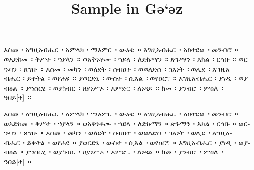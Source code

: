 \documentclass[12pt]{article}
\begin{document}
\title{Sample in Gǝ`ǝz}
\maketitle

\newdimen\savehsize
\savehsize\hsize

\def\test#1{\endgraf\hsize=1pt\noindent #1\endgraf\hsize=\savehsize}

\begin{amharic}
እስመ~፡ አግዚአብሔር~፡ አምላክ~፡ ማእምር~፡ ውእቱ~። እግዚአብሔር~፡ አስተደወ~፡ መንብሮ~። ወአድከመ~፡ ቅሥተ~፡ ኀያላን~። ወአቅነቶሙ~፡ ኀይለ~፡ ለድኩማን~። ጽጉማን~፡ እክል~፡ ርኅቡ~። ወርኁባን~፡ ጸግቡ~። እስመ~፡ መካን~፡ ወለደት~፡ ሰብዐተ~፡ ወወለድሰ~፡ ስእነት~፡ ወሊደ~፡ እግዚአብሔር~፡ ይቀትል~፡ ወየሐዩ~። ያወርድኒ~፡ ውስተ~፡ ሲእል~፡ ወየዐርግ~። እግዚአብሔር~፡ ያነዲ~፡ ወያብዕል~። ያኀስርሂ~፡ ወያከብር~፡ ዘያነሥኦ~፡ እምድር~፡ ለነዳይ~። ከመ~፡ ያንብሮ~፡ ምስለ~፡ ዓበይ[ተ]~።

\test{እስመ~፡ አግዚአብሔር~፡ አምላክ~፡ ማእምር~፡ ውእቱ~። እግዚአብሔር~፡ አስተደወ~፡ መንብሮ~። ወአድከመ~፡ ቅሥተ~፡ ኀያላን~። ወአቅነቶሙ~፡ ኀይለ~፡ ለድኩማን~። ጽጉማን~፡ እክል~፡ ርኅቡ~። ወርኁባን~፡ ጸግቡ~። እስመ~፡ መካን~፡ ወለደት~፡ ሰብዐተ~፡ ወወለድሰ~፡ ስእነት~፡ ወሊደ~፡ እግዚአብሔር~፡ ይቀትል~፡ ወየሐዩ~። ያወርድኒ~፡ ውስተ~፡ ሲእል~፡ ወየዐርግ~። እግዚአብሔር~፡ ያነዲ~፡ ወያብዕል~። ያኀስርሂ~፡ ወያከብር~፡ ዘያነሥኦ~፡ እምድር~፡ ለነዳይ~። ከመ~፡ ያንብሮ~፡ ምስለ~፡ ዓበይ[ተ]~።}
\end{amharic}
\end{document}
